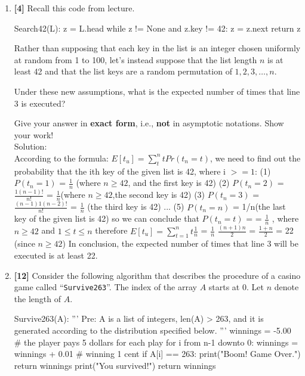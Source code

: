 \documentclass{assignment-263}
\author{Si Tong Liu(1004339628), Jing Huang(1003490705), Yifei Gao(1004152640)}
\begin{document}
\think
\begin{enumerate}
\item \textbf{[4]}
Recall this code from lecture.

\begin{python}
Search42(L):
  z = L.head
  while z != None and z.key != 42:
     z = z.next
  return z
\end{python}

Rather than supposing that each key in the list is an integer chosen uniformly at random from 1 to 100, let's instead suppose that the list length $n$ is at least 42 and that the list keys are a random permutation of $1, 2, 3, \ldots, n$.

Under these new assumptions, what is the expected number of times that line 3 is executed? 

Give your answer in \textbf{exact form}, i.e., \textbf{not} in asymptotic
		notations. Show your work! \\[2ex]

Solution: \\[2ex]
According to the formula: $E[t_{u}] = \sum_{t}^{n} tPr(t_{n}=t)$, we need to find out the probability that the ith key of the given list is 42, where i $>= 1$:\vskip5pt
(1) $P(t_{n} = 1)$ = $\frac{1}{n}$  (where $n\ge42$, and the first key is 42)\vskip5pt
(2) $P(t_{n} = 2)$ = $\frac{1(n-1)!}{n!}$ = $\frac{1}{n}$(where $n\ge42$,the second key is 42)\vskip5pt
(3) $P(t_{n} = 3)$ = $\frac{(n-1)1(n-2)!}{n!}$ = $\frac{1}{n}$  (the third key is 42)\vskip5pt
... \vskip5pt
(5) $P(t_{n} = n)$ = 1/n(the last key of the given list is 42)\vskip5pt
so we can conclude that $P(t_{n} = t)$ = = $\frac{1}{n}$ , where $n\ge42$ and $1\le t \le n$\vskip5pt
therefore $E[t_{u}] = \sum_{t=1}^{n} t \frac{1}{n}$ = $\frac{1}{n}$ $\frac{(n+1)n}{2}$ = $\frac{1+n}{2}$ = 22 (since $n\ge42$)\vskip5pt
In conclusion, the expected number of times that line 3 will be executed is at least 22.\\[2ex]



\item \textbf{[12]}
		Consider the following algorithm that describes the procedure of a
		casino game called ``\texttt{Survive263}''. The index of the array $A$ starts
		at $0$. Let $n$ denote the length of $A$.

\begin{python}
   Survive263(A):
      '''
      Pre: A is a list of integers, len(A) > 263, and it is generated 
           according to the distribution specified below.
      '''
      winnings = -5.00   # the player pays 5 dollars for each play
      for i from n-1 downto 0:
         winnings = winnings + 0.01  # winning 1 cent
         if A[i] == 263:
            print("Boom! Game Over.")
            return winnings
      print("You survived!")
      return winnings
\end{python}


\end{enumerate}
\end{document}
